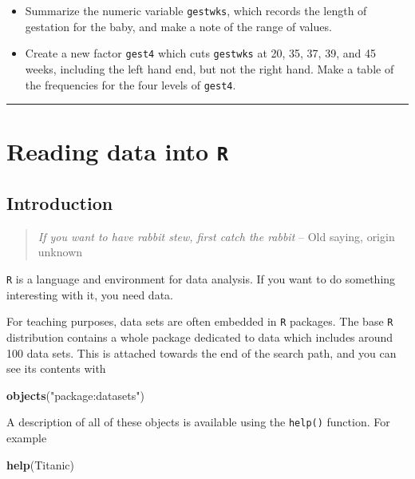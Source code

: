 \documentclass[
]{book}
\newenvironment{Shaded}{\begin{snugshade}}{\end{snugshade}}
\newcommand{\FunctionTok}[1]{\textcolor[rgb]{0.13,0.29,0.53}{\textbf{#1}}}
\newcommand{\NormalTok}[1]{#1}
\newcommand{\StringTok}[1]{\textcolor[rgb]{0.31,0.60,0.02}{#1}}
\begin{document}
\begin{itemize}
\item
  Summarize the numeric variable \texttt{gestwks}, which records the
  length of gestation for the baby, and make a note of the range of
  values.
\item
  Create a new factor \texttt{gest4} which cuts \texttt{gestwks} at 20,
  35, 37, 39, and 45 weeks, including the left hand end, but not the
  right hand. Make a table of the frequencies for the four levels of \texttt{gest4}.
\end{itemize}

\begin{center}\rule{0.5\linewidth}{0.5pt}\end{center}

\chapter{\texorpdfstring{Reading data into \texttt{R}}{Reading data into R}}\label{reading-data-into-r}

\section{Introduction}\label{introduction}

\begin{quote}
\emph{If you want to have rabbit stew, first catch the rabbit} -- Old saying, origin unknown
\end{quote}

\texttt{R} is a language and environment for data analysis. If you
want to do something interesting with it, you need data.

For teaching purposes, data sets are often embedded in \texttt{R}
packages. The base \texttt{R} distribution contains a whole package
dedicated to data which includes around 100 data sets. This is
attached towards the end of the search path, and you can see its
contents with

\begin{Shaded}
\begin{Highlighting}[]
\FunctionTok{objects}\NormalTok{(}\StringTok{"package:datasets"}\NormalTok{)}
\end{Highlighting}
\end{Shaded}

A description of all of these objects is available using the \texttt{help()}
function. For example

\begin{Shaded}
\begin{Highlighting}[]
\FunctionTok{help}\NormalTok{(Titanic)}
\end{Highlighting}
\end{Shaded}
\end{document}
